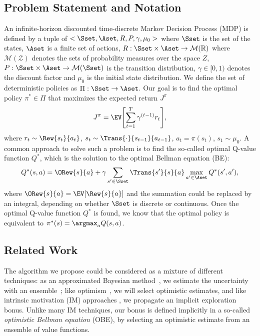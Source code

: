 \subsection{Problem Statement and Notation}
An infinite-horizon discounted time-discrete Markov Decision Process (MDP) 
is defined by a tuple of $<\Sset, \Aset,R,P,\gamma, \mu_0>$
where $\Sset$ is the set of the states, $\Aset$ is a finite set of
actions, $R:\Sset \times \Aset \to \mathcal{M}(\mathbb{R})$ where
$\mathcal{M(Z)}$ denotes the sets of probability measures over the
space $Z$, $P:\Sset \times \Aset \to \mathcal{M}(\Sset)$ is the
transition distribution, $\gamma \in [0,1)$ denotes the discount
factor and $\mu_0$ is the initial state distribution.  We define the
set of deterministic policies as $\Pi:\Sset \to \Aset$. Our goal is
to find the optimal policy $\pi^* \in \Pi$ that maximizes the
expected return $J^{\pi}$
\begin{equation}
J^{\pi} = \EV \Biggl[ \sum_{t=1}^T \gamma^{(t-1)} r_t\Biggr],  \nonumber
\end{equation} 
where $r_t \sim \Rew{s_t}{a_t}$, $s_t \sim \Trans{\cdot}{s_{t-1}}{a_{t-1}}$, $a_t = \pi(s_t)$, $s_1 \sim \mu_0$.
A common approach to solve such a problem is to find the so-called optimal Q-value function $Q^*$, which is the solution to the optimal Bellman equation (BE):
\begin{equation}
Q^*(s,a) = \ORew{s}{a} + \gamma \sum_{s' \in \Sset} \Trans{s'}{s}{a} \max_{a' \in \Aset} Q^*(s',a'), \label{bellman equation}
\end{equation}
where $\ORew{s}{a} = \EV[\Rew{s}{a}]$ and the summation could be replaced by an integral, depending on whether $\Sset$ is discrete or continuous.
Once the optimal Q-value function $Q^*$ is found, we know that the optimal policy is equivalent to $\pi^*(s) = \argmax_{a}Q(s,a)$.

\subsection{Related Work}

The algorithm we propose could be considered as a mixture of
different techniques: as an approximated Bayesian method~\cite{engel2005reinforcement,vlassis2012bayesian}, we estimate
the uncertainty with an ensemble~\cite{osband2016deep}; like
optimism~\cite{lai1985asymptotically,kearns2002near,brafman2002r,azizzadenesheli2517efficient}, we will
select optimistic estimates, and like intrinsic motivation (IM) approaches 
\cite{singh2004intrinsically,schmidhuber2008driven,white2010interval}, we propagate an implicit exploration bonus. Unlike
   many IM techniques, our bonus is defined implicitly in a so-called \textsl{optimistic Bellman
    equation} (OBE), by selecting an optimistic estimate from an ensemble of value
functions.


